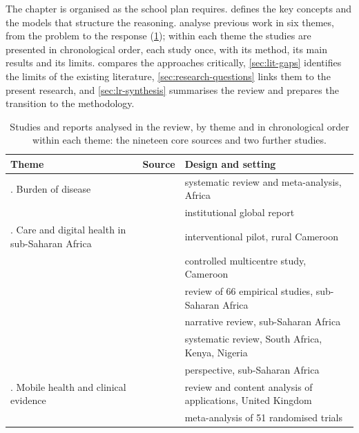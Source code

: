 \documentclass[11pt,a4paper,oneside]{report}
\begin{document}
The chapter is organised as the school plan requires.  defines the key concepts and the models that structure the reasoning.  analyse previous work in six themes, from the problem to the response (\cref{tab:lr-overview}); within each theme the studies are presented in chronological order, each study once, with its method, its main results and its limits.  compares the approaches critically, \cref{sec:lit-gaps} identifies the limits of the existing literature, \cref{sec:research-questions} links them to the present research, and \cref{sec:lr-synthesis} summarises the review and prepares the transition to the methodology.

\begin{table}[htbp]
\centering\footnotesize
\caption{Studies and reports analysed in the review, by theme and in chronological order within each theme: the nineteen core sources and two further studies.}\label{tab:lr-overview}
\begin{tabularx}{\textwidth}{@{}>{\raggedright\arraybackslash}p{3.4cm} >{\raggedright\arraybackslash}p{3.9cm} >{\raggedright\arraybackslash}X@{}}
\toprule
\textbf{Theme} & \textbf{Source} & \textbf{Design and setting} \\
\midrule
1. Burden of disease & \textcite{hinneh2023} & systematic review and meta-analysis, Africa \\
 & \textcite{who2023hypertension} & institutional global report \\
\addlinespace
2. Care and digital health in sub-Saharan Africa & \textcite{kingue2013} & interventional pilot, rural Cameroon \\
 & \textcite{bediang2021} & controlled multicentre study, Cameroon \\
 & \textcite{dodoo2022} & review of 66 empirical studies, sub-Saharan Africa \\
 & \textcite{gafane2024} & narrative review, sub-Saharan Africa \\
 & \textcite{agbeyangi2025} & systematic review, South Africa, Kenya, Nigeria \\
 & \textcite{segun2025} & perspective, sub-Saharan Africa \\
\addlinespace
3. Mobile health and clinical evidence & \textcite{alessa2019} & review and content analysis of applications, United Kingdom \\
 & \textcite{mao2020} & meta-analysis of 51 randomised trials \\

\end{tabularx}
\end{table}
\end{document}
